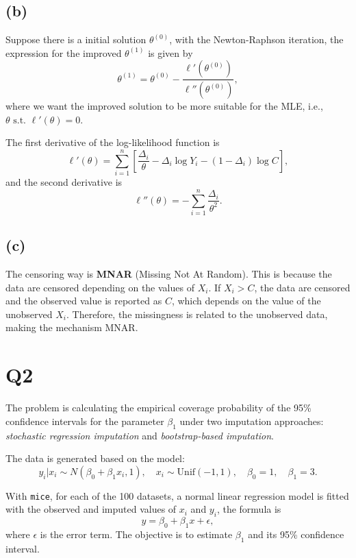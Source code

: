 \documentclass{article}
\begin{document}
\newpage

\subsection{(b)}

Suppose there is a initial solution \( \theta^{(0)} \), with the Newton-Raphson iteration, the expression for the improved \( \theta^{(1)} \) is given by
\[
\theta^{(1)} = \theta^{(0)} - \frac{\ell'(\theta^{(0)})}{\ell''(\theta^{(0)})},
\]
where we want the improved solution to be more suitable for the MLE, i.e., \( \theta \textrm{ s.t. } \ell'(\theta) = 0\).

The first derivative of the log-likelihood function is
\[
\ell'(\theta) = \sum_{i=1}^{n} \left[ \frac{\Delta_i}{\theta} - \Delta_i \log Y_i - (1 - \Delta_i) \log C \right],
\]
and the second derivative is
\[
\ell''(\theta) = -\sum_{i=1}^{n} \frac{\Delta_i}{\theta^2}.
\]

\newpage

\subsection{(c)} 
The censoring way is \textbf{MNAR} (Missing Not At Random). This is because the data are censored depending on the values of \( X_i \). If \( X_i > C \), the data are censored and the observed value is reported as \( C \), which depends on the value of the unobserved \( X_i \). Therefore, the missingness is related to the unobserved data, making the mechanism MNAR.

\newpage

\section{Q2}
The problem is calculating the empirical coverage probability of the 95\% confidence intervals for the parameter \(\beta_1\) under two imputation approaches: \textit{stochastic regression imputation} and \textit{bootstrap-based imputation}.

The data is generated based on the model:
\[
y_i | x_i \sim N(\beta_0 + \beta_1 x_i, 1), \quad x_i \sim \text{Unif}(-1, 1), \quad \beta_0 = 1, \quad \beta_1 = 3.
\]

With \texttt{mice}, for each of the 100 datasets, a normal linear regression model is fitted with the observed and imputed values of \(x_i\) and \(y_i\), the formula is
\[
y = \beta_0 + \beta_1 x + \epsilon,
\]
where \(\epsilon\) is the error term. The objective is to estimate \(\beta_1\) and its 95\% confidence interval.
\end{document}
